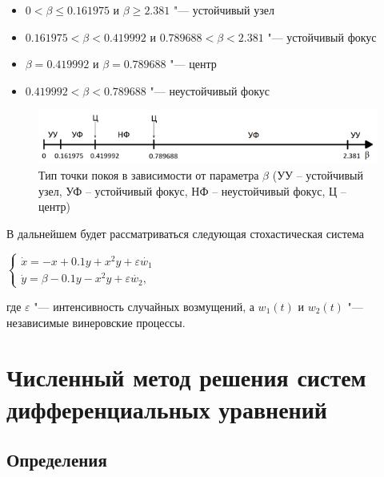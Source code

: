 \documentclass[a4paper, 14pt]{article}
\begin{document}
		\begin{itemize}
			\item $0 < \beta \le 0.161975$ и $\beta \ge 2.381$ "--- устойчивый узел
			\item $0.161975 < \beta < 0.419992$ и $0.789688 < \beta < 2.381$ "--- устойчивый фокус
			\item $\beta = 0.419992$ и $\beta = 0.789688$ "--- центр
			\item $0.419992 < \beta < 0.789688 $ "--- неустойчивый фокус 
		\end{itemize}
		
		\begin{figure}[h]
			\begin{center}
				\includegraphics[scale=0.65]{img/type_eq_points.png}\caption{Тип точки покоя в зависимости от параметра $\beta$ (УУ – устойчивый узел, УФ – устойчивый фокус, НФ – неустойчивый фокус, Ц – центр)}
			\end{center}
		\end{figure}
		
		\newpage
		
		В дальнейшем будет рассматриваться следующая стохастическая система
		
		\begin{center}
			\begin{math}
				\begin{cases}
					\dot x = -x + 0.1y + x^2y + \varepsilon\dot{w_1} \\
					\dot y = \beta - 0.1y - x^2y + \varepsilon\dot{w_2},
				\end{cases}
			\end{math}
		\end{center}
		
		где $\varepsilon$ "--- интенсивность случайных возмущений, а $w_1(t)$ и $w_2(t)$ "--- независимые винеровские процессы.
		
	\section{Численный метод решения систем дифференциальных уравнений}
		
		\subsection{Определения}
		
\end{document}
